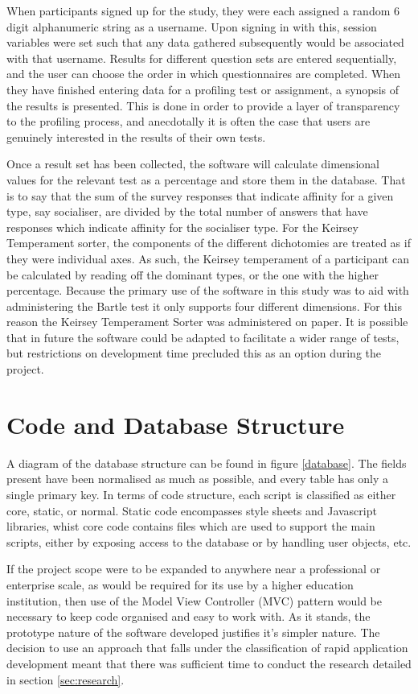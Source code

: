 \documentclass[12pt,a4paper,twoside]{report}
\begin{document}
When participants signed up for the study, they were each assigned a random 6 digit alphanumeric string as a username. Upon signing in with this, session variables were set such that any data gathered subsequently would be associated with that username. Results for different question sets are entered sequentially, and the user can choose the order in which questionnaires are completed. When they have finished entering data for a profiling test or assignment, a synopsis of the results is presented. This is done in order to provide a layer of transparency to the profiling process, and anecdotally it is often the case that users are genuinely interested in the results of their own tests.

Once a result set has been collected, the software will calculate dimensional values for the relevant test as a percentage and store them in the database. That is to say that the sum of the survey responses that indicate affinity for a given type, say socialiser, are divided by the total number of answers that have responses which indicate affinity for the socialiser type. For the Keirsey Temperament sorter, the components of the different dichotomies are treated as if they were individual axes. As such, the Keirsey temperament of a participant can be calculated by reading off the dominant types, or the one with the higher percentage. Because the primary use of the software in this study was to aid with administering the Bartle test it only supports four different dimensions. For this reason the Keirsey Temperament Sorter was administered on paper. It is possible that in future the software could be adapted to facilitate a wider range of tests, but restrictions on development time precluded this as an option during the project.

\section{Code and Database Structure}
A diagram of the database structure can be found in figure \ref{database}. The fields present have been normalised as much as possible, and every table has only a single primary key. In terms of code structure, each script is classified as either core, static, or normal. Static code encompasses style sheets and Javascript libraries, whist core code contains files which are used to support the main scripts, either by exposing access to the database or by handling user objects, etc. 

If the project scope were to be expanded to anywhere near a professional or enterprise scale, as would be required for its use by a higher education institution, then use of the Model View Controller (MVC) pattern would be necessary to keep code organised and easy to work with. As it stands, the prototype nature of the software developed justifies it's simpler nature. The decision to use an approach that falls under the classification of rapid application development meant that there was sufficient time to conduct the research detailed in section \ref{sec:research}.
\end{document}
